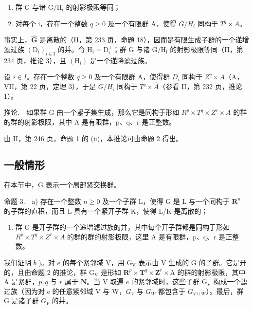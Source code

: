 \begin{enumerate}
\def\labelenumi{\alph{enumi})}
\item
  群 G 与诸 \(\mathrm{G / H_i}\) 的射影极限等同；
\item
  对每个 i，存在一个整数 \(q \geqslant 0\) 及一个有限群 A，使得 \(G/H_{i}\) 同构于 \(T^{q} \times A\)。
\end{enumerate}

事实上，\(\widehat{\mathbf{G}}\) 是离散的（II，第 233 页，命题 18），因而是有限生成子群的一个递增滤过族 \((\mathrm{D}_i)_{i\in \mathrm{I}}\) 的并。令 \(\mathrm{H}_i = \mathrm{D}_i^\perp\)；群 G 与诸 \(\mathrm{G / H_i}\) 的射影极限等同（II，第 234 页，推论 3），且 \((\mathrm{H}_i)\) 是一个递降滤过族。

设 \(i \in I\)。存在一个整数 \(q \geqslant 0\) 及一个有限群 A，使得群 \(D_{i}\) 同构于 \(Z^{q} \times A\)（A，VII，第 22 页，定理 3），于是 \(G/H_{i}\) 同构于 \(T^{q} \times \widehat{A}\)（参看 II，第 232 页，推论 1）。

推论.　如果群 G 由一个紧子集生成，那么它是同构于形如 \(R^{p} \times T^{q} \times Z^{r} \times A\) 的群的群的射影极限，其中 A 是有限群，p、q、r 是正整数。

由 II，第 246 页，命题 1 的 (ii)，本推论可由命题 2 得出。

\subsection{一般情形}

在本节中，G 表示一个局部紧交换群。

命题 3.　a) 存在一个整数 \(n \geqslant 0\) 及一个子群 L，使得 G 是 L 与一个同构于 \(\mathbf{R}^n\) 的子群的直积，而且 L 具有一个紧开子群 K，使得 L/K 是离散的；

\begin{enumerate}
\def\labelenumi{\alph{enumi})}
\setcounter{enumi}{1}
\tightlist
\item
  群 G 是开子群的一个递增滤过族的并，其中每个开子群都是同构于形如 \(R^{p} \times T^{q} \times Z^{r} \times A\) 的群的群的射影极限，这里 A 是有限群，p、q、r 是正整数。
\end{enumerate}

我们证明 \(b\) )。对 \(e\) 的每个紧邻域 V，用 \(\mathrm{G_V}\) 表示由 V 生成的 G 的子群。它是开的，且由命题 2 的推论，群 \(\mathrm{G_V}\) 是形如 \(\mathbf{R}^p\times \mathbf{T}^q\times \mathbf{Z}^r\times \mathrm{A}\) 的群的射影极限，其中 A 是紧群，\(p,q\) 与 \(r\) 属于 \(\mathbf{N}\)。当 V 取遍 \(e\) 的紧邻域时，这些子群 \(\mathrm{G_V}\) 构成一个滤过族（因为对 e 的任意紧邻域 V 与 W，\(G_{V}\) 与 \(G_{W}\) 都包含于 \(G_{V\cup W}\)）。最后，群 G 是诸子群 \(G_{V}\) 的并。

